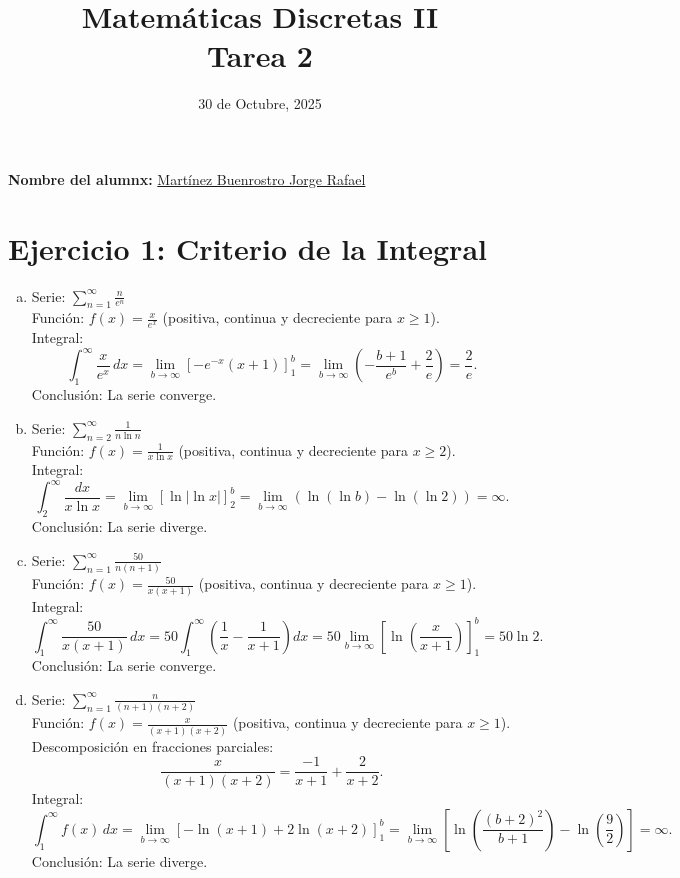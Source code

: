 \documentclass[12pt,a4paper]{article}
\title{Matemáticas Discretas II\\
Tarea 2}
\date{30 de Octubre, 2025}
\author{}
\begin{document}
\maketitle

\noindent\textbf{Nombre del alumnx:} \underline{\hspace{0.5cm}Martínez Buenrostro Jorge Rafael\hspace{0.5cm}}

\vspace{1cm}

\section*{Ejercicio 1: Criterio de la Integral}

\begin{enumerate}[a)]
    \item Serie: $\sum_{n=1}^{\infty} \frac{n}{e^n}$ \\
    Función: $f(x) = \frac{x}{e^x}$ (positiva, continua y decreciente para $x \geq 1$). \\
    Integral: 
    \[
    \int_{1}^{\infty} \frac{x}{e^x} \, dx = \lim_{b \to \infty} \left[ -e^{-x}(x+1) \right]_{1}^{b} = \lim_{b \to \infty} \left( -\frac{b+1}{e^b} + \frac{2}{e} \right) = \frac{2}{e}.
    \]
    Conclusión: La serie converge.

    \item Serie: $\sum_{n=2}^{\infty} \frac{1}{n \ln n}$ \\
    Función: $f(x) = \frac{1}{x \ln x}$ (positiva, continua y decreciente para $x \geq 2$). \\
    Integral:
    \[
    \int_{2}^{\infty} \frac{dx}{x \ln x} = \lim_{b \to \infty} \left[ \ln |\ln x| \right]_{2}^{b} = \lim_{b \to \infty} \left( \ln(\ln b) - \ln(\ln 2) \right) = \infty.
    \]
    Conclusión: La serie diverge.

    \item Serie: $\sum_{n=1}^{\infty} \frac{50}{n(n+1)}$ \\
    Función: $f(x) = \frac{50}{x(x+1)}$ (positiva, continua y decreciente para $x \geq 1$). \\
    Integral:
    \[
    \int_{1}^{\infty} \frac{50}{x(x+1)} \, dx = 50 \int_{1}^{\infty} \left( \frac{1}{x} - \frac{1}{x+1} \right) dx = 50 \lim_{b \to \infty} \left[ \ln \left( \frac{x}{x+1} \right) \right]_{1}^{b} = 50 \ln 2.
    \]
    Conclusión: La serie converge.

    \item Serie: $\sum_{n=1}^{\infty} \frac{n}{(n+1)(n+2)}$ \\
    Función: $f(x) = \frac{x}{(x+1)(x+2)}$ (positiva, continua y decreciente para $x \geq 1$). \\
    Descomposición en fracciones parciales:
    \[
    \frac{x}{(x+1)(x+2)} = \frac{-1}{x+1} + \frac{2}{x+2}.
    \]
    Integral:
    \[
    \int_{1}^{\infty} f(x) \, dx = \lim_{b \to \infty} \left[ -\ln(x+1) + 2 \ln(x+2) \right]_{1}^{b} = \lim_{b \to \infty} \left[ \ln \left( \frac{(b+2)^2}{b+1} \right) - \ln \left( \frac{9}{2} \right) \right] = \infty.
    \]
    Conclusión: La serie diverge.
\end{enumerate}
\end{document}
